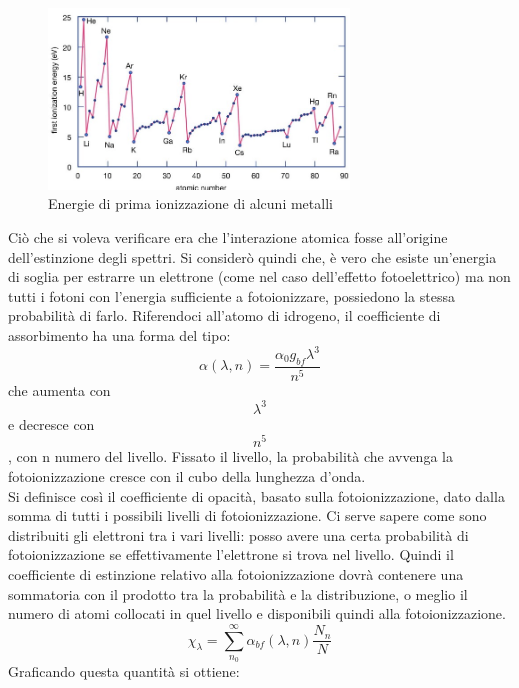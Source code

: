 \documentclass[a4paper,11pt]{article}
\begin{document}
     \begin{figure}[h!!]
        \centering
        \includegraphics[width=8cm]{energie_prima_ionizzazione.jpg}
        \caption{Energie di prima ionizzazione di alcuni metalli}
        \label{fig: energie di prima ionizzazione }
      \end{figure}
    Ciò che si voleva verificare era che l'interazione atomica fosse all'origine dell'estinzione degli spettri. Si considerò quindi che,
    è vero che esiste un'energia di soglia per estrarre un elettrone (come nel caso dell'effetto fotoelettrico) ma non tutti i fotoni con l'energia sufficiente a fotoionizzare, possiedono la stessa probabilità di farlo. Riferendoci all'atomo di idrogeno, il coefficiente di assorbimento ha una forma del tipo:
    $$
    {\alpha({\lambda},n)} = \frac{{\alpha_{0} g_{bf}{\lambda^3}}}{n^5}
    $$
    che aumenta con $${\lambda^3} $$ e decresce con $${n^5}$$, con n      numero del livello. Fissato il livello, la probabilità che avvenga la fotoionizzazione cresce con il cubo della lunghezza d'onda. \\
    Si definisce così il coefficiente di opacità, basato sulla fotoionizzazione, dato dalla somma di tutti i possibili livelli di fotoionizzazione. Ci serve sapere come sono distribuiti gli elettroni tra i vari livelli: posso avere una certa probabilità di fotoionizzazione se effettivamente l'elettrone si trova nel livello. Quindi il coefficiente di estinzione relativo alla fotoionizzazione dovrà contenere una sommatoria con il prodotto tra la probabilità e la distribuzione, o meglio il numero di atomi collocati in quel livello e disponibili quindi alla fotoionizzazione.
    $$
    {\chi_{\lambda}} = \sum_{n_0}^{\infty} {\alpha_{bf}}({\lambda},n)\frac{N_n}{N}
    $$
    Graficando questa quantità si ottiene:\\
    
\end{document}
